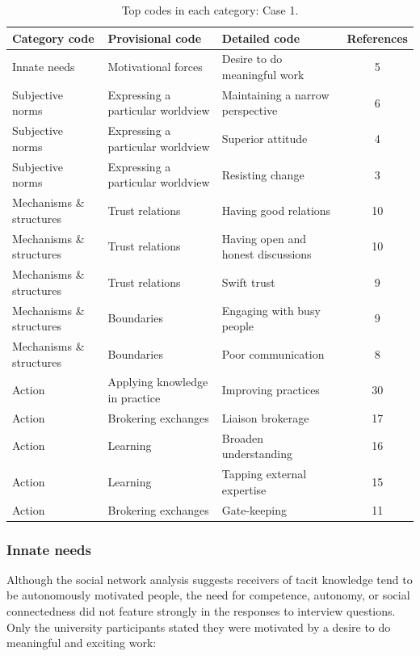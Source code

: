 \begin{table}
\centering
\caption{Top codes in each category: Case 1.}
\label{tab:case_1_codes}
\begin{tabular}{lllc}
\toprule
Category code & Provisional code & Detailed code & References \\ 
\midrule
Innate needs & Motivational forces & Desire to do meaningful work &   5 \\
Subjective norms & Expressing a particular worldview & Maintaining a narrow perspective &   6 \\ 
Subjective norms & Expressing a particular worldview & Superior attitude &   4 \\ 
Subjective norms & Expressing a particular worldview & Resisting change &   3 \\ 
Mechanisms \& structures & Trust relations & Having good relations &  10 \\ 
Mechanisms \& structures & Trust relations & Having open and honest discussions &  10 \\ 
Mechanisms \& structures & Trust relations & Swift trust &   9 \\ 
Mechanisms \& structures & Boundaries & Engaging with busy people &   9 \\ 
Mechanisms \& structures & Boundaries & Poor communication &   8 \\ 
Action & Applying knowledge in practice & Improving practices &  30 \\ 
Action & Brokering exchanges & Liaison brokerage &  17 \\ 
Action & Learning & Broaden understanding &  16 \\ 
Action & Learning & Tapping external expertise &  15 \\ 
Action & Brokering exchanges & Gate-keeping &  11 \\ 
\bottomrule
\end{tabular}
\end{table}

\subsubsection{Innate needs}

Although the social network analysis suggests receivers of tacit knowledge tend to be autonomously motivated people, the need for competence, autonomy, or social connectedness did not feature strongly in the responses to interview questions. Only the university participants stated they were motivated by a desire to do meaningful and exciting work:

